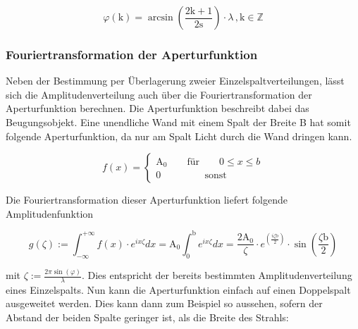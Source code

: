 \documentclass[titlepage = firstcover]{scrartcl}
\begin{document}
                    \begin{equation}
                        \varphi(\text{k}) = \arcsin \left(\frac{2\text{k} + 1}{2\text{s}}\right) \cdot \lambda \, , \text{k} \in \mathds{Z}
                        \label{eqn:NSTCOShoch2}
                    \end{equation}


                \subsubsection*{Fouriertransformation der Aperturfunktion}
                    Neben der Bestimmung per Überlagerung zweier Einzelspaltverteilungen, lässt sich die Amplitudenverteilung auch über die Fouriertransformation der Aperturfunktion berechnen. Die
                    Aperturfunktion beschreibt dabei das Beugungsobjekt. Eine unendliche Wand mit einem Spalt der Breite B hat somit folgende Aperturfunktion, da nur am Spalt Licht durch die
                    Wand dringen kann.

                    \begin{equation*}
                        f(x) =  \begin{cases}
                            \text{A}_0 \qquad \text{für} \qquad 0 \leqslant x \leqslant b \\
                            0 \qquad \qquad \: \: \text{sonst}
                        \end{cases}
                    \end{equation*}

                    \noindent
                    Die Fouriertransformation dieser Aperturfunktion liefert folgende Amplitudenfunktion

                    \begin{equation}
                        g(\zeta) := \int_{-\infty}^{+\infty} f(x) \cdot e^{ix\zeta} dx = \text{A}_0 \int_0^{\text{b}} e^{ix\zeta} dx = \frac{2\text{A}_0}{\zeta} \cdot e^{\left(\frac{i\zeta \text{b}}{2}\right)} \cdot \sin\left(\frac{\zeta\text{b}}{2}\right)
                        \label{eqn:AmplitudeFT}
                    \end{equation}

                    \noindent
                    mit $\zeta := \frac{2\pi \sin(\varphi)}{\lambda}$. Dies entspricht der bereits bestimmten Amplitudenverteilung eines Einzelspalts. Nun kann die Aperturfunktion einfach auf
                    einen Doppelspalt ausgeweitet werden. Dies kann dann zum Beispiel so aussehen, sofern der Abstand der beiden Spalte geringer ist, als die Breite des Strahls:
\end{document}
